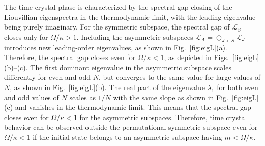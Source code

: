 \documentclass[pra,aps,twocolumn,superscriptaddress,notitlepage]{revtex4-1}
\begin{document}
	The time-crystal phase is characterized by the spectral gap closing of the Liouvillian eigenspectra in the thermodynamic limit, with the leading eigenvalue being purely imaginary.  
	For the symmetric subspace, the spectral gap of $\mathcal{L}_S$ closes only for $\Omega/\kappa>1$.
	Including the asymmetric subspaces $\mathcal{L}_A=\oplus_{J<S} \mathcal{L}_J$ introduces new leading-order eigenvalues, as shown in Fig.~\ref{fig:eigL}(a). Therefore, the spectral gap closes even for $\Omega/\kappa <1$, as depicted in Figs.~\ref{fig:eigL}(b)--(c). 
	The first dominant eigenvalue in the asymmetric subspace scales differently for even and odd $N$, but converges to the same value for large values of $N$, as shown in Fig.~\ref{fig:eigL}(b). 
	The real part of the eigenvalue $\lambda_1$ for both even and odd values of $N$ scales as $1/N$ with the same slope as shown in Fig.~\ref{fig:eigL}(c) and vanishes in the thermodynamic limit.
	This means that the spectral gap closes even for $\Omega/\kappa<1$ for the asymmetric subspaces.
	Therefore, time crystal behavior can be observed outside the permutational symmetric subspace even for $\Omega/\kappa<1$ if the initial state belongs to an asymmetric subspace having $m<\Omega/\kappa$.
	
\end{document}
